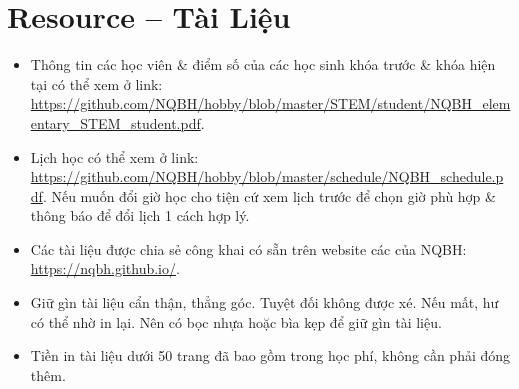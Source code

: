 \documentclass{article}
\numberwithin{equation}{section}
\begin{document}
\section{Resource -- Tài Liệu}

\begin{itemize}
	\item Thông tin các học viên \& điểm số của các học sinh khóa trước \& khóa hiện tại có thể xem ở link:\\\url{https://github.com/NQBH/hobby/blob/master/STEM/student/NQBH_elementary_STEM_student.pdf}.
	\item Lịch học có thể xem ở link: \url{https://github.com/NQBH/hobby/blob/master/schedule/NQBH_schedule.pdf}. Nếu muốn đổi giờ học cho tiện cứ xem lịch trước để chọn giờ phù hợp \& thông báo để đổi lịch 1 cách hợp lý.
	\item Các tài liệu được chia sẻ công khai có sẵn trên website các của NQBH: \url{https://nqbh.github.io/}.
	\item Giữ gìn tài liệu cẩn thận, thẳng góc. Tuyệt đối không được xé. Nếu mất, hư có thể nhờ in lại. Nên có bọc nhựa hoặc bìa kẹp để giữ gìn tài liệu.
	\item Tiền in tài liệu dưới 50 trang đã bao gồm trong học phí, không cần phải đóng thêm.
\end{itemize}


\printbibliography[heading=bibintoc]
	
\end{document}

